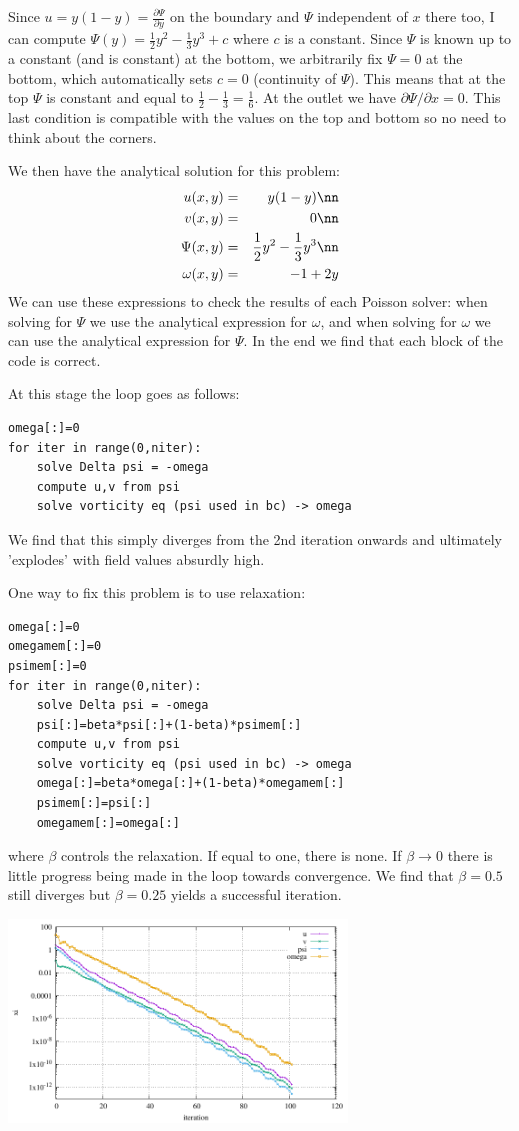 Since $u=y(1-y) = \frac{\partial \Psi}{\partial y}$ on the boundary and $\Psi$ independent of $x$ there too, I can compute 
$\Psi(y)=\frac12 y^2 - \frac13 y^3 + c$ where $c$ is a constant.
Since $\Psi$ is known up to a constant (and is constant) at the bottom, we arbitrarily fix $\Psi=0$ at the bottom, which automatically sets $c=0$ (continuity of $\Psi$). 
This means that at the top $\Psi$ is constant and equal to $\frac12-\frac13=\frac16$. At the outlet we have $\partial \Psi/\partial x=0$. This last condition is 
compatible with the values on the top and bottom so no need to think about the corners.

We then have the analytical solution for this problem:
\begin{eqnarray}
u(x,y)&=& y(1-y) \nn\\
v(x,y)&=& 0 \nn\\
\Psi(x,y)&=& \frac12 y^2 - \frac13 y^3  \nn\\
\omega(x,y) &=& - 1+2y
\end{eqnarray}
We can use these expressions to check the results of each Poisson solver: 
when solving for $\Psi$ we use the analytical expression for $\omega$, and when 
solving for $\omega$ we can use the analytical expression for $\Psi$. 
In the end we find that each block of the code is correct. 

At this stage the loop goes as follows:
\begin{verbatim}
omega[:]=0
for iter in range(0,niter):
    solve Delta psi = -omega
    compute u,v from psi 
    solve vorticity eq (psi used in bc) -> omega
\end{verbatim}
We find that this simply diverges from the 2nd iteration onwards and ultimately 'explodes' with field values absurdly high.

One way to fix this problem is to use relaxation:
\begin{verbatim}
omega[:]=0
omegamem[:]=0
psimem[:]=0
for iter in range(0,niter):
    solve Delta psi = -omega
    psi[:]=beta*psi[:]+(1-beta)*psimem[:]
    compute u,v from psi 
    solve vorticity eq (psi used in bc) -> omega
    omega[:]=beta*omega[:]+(1-beta)*omegamem[:]
    psimem[:]=psi[:]
    omegamem[:]=omega[:]
\end{verbatim}
where $\beta$ controls the relaxation. If equal to one, there is none. If $\beta\rightarrow 0$ there is little progress being made in the loop towards convergence.
We find that $\beta=0.5$ still diverges but $\beta=0.25$ yields a successful iteration.

\begin{center}
\includegraphics[width=9cm]{python_codes/fieldstone_154/results/conv.pdf}
\end{center}

